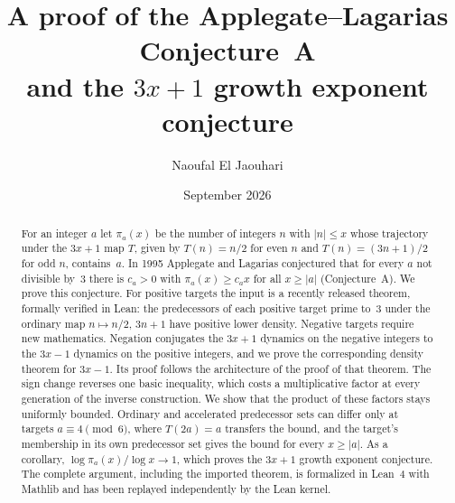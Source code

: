 \documentclass[11pt]{amsart}
\theoremstyle{definition}
\theoremstyle{remark}
\DeclareRobustCommand*{\xvar}{x}
\begin{document}
\title[Conjecture~A and the $3\xvar+1$ growth exponent conjecture]%
{A proof of the Applegate--Lagarias Conjecture~A\\ and the $3x+1$ growth exponent conjecture}

\author{Naoufal El Jaouhari}
\address{Independent researcher}


\date{September 2026}

\begin{abstract}
For an integer $a$ let $\pi_a(x)$ be the number of integers $n$ with $|n|\le x$ whose trajectory
under the $3x+1$ map $T$, given by $T(n)=n/2$ for even $n$ and $T(n)=(3n+1)/2$ for odd $n$,
contains~$a$. In 1995 Applegate and Lagarias conjectured that for every $a$ not divisible by~$3$
there is $c_a>0$ with $\pi_a(x)\ge c_a x$ for all $x\ge |a|$ (Conjecture~A). We prove this
conjecture. For positive targets the input is a recently released theorem, formally verified in
Lean: the predecessors of each positive target prime to~$3$ under the ordinary map
$n\mapsto n/2,\,3n+1$ have positive lower density. Negative targets require new mathematics. Negation conjugates the
$3x+1$ dynamics on the negative integers to the $3x-1$ dynamics on the positive integers, and we
prove the corresponding density theorem for $3x-1$. Its proof follows the architecture of the proof of that theorem. The
sign change reverses one basic inequality, which costs a multiplicative factor at every generation
of the inverse construction. We show that the product of these factors stays uniformly bounded.
Ordinary and accelerated predecessor sets can differ only at targets $a\equiv 4\pmod 6$, where
$T(2a)=a$ transfers the bound, and the target's membership in its own predecessor set gives the
bound for every $x\ge|a|$. As a corollary, $\log\pi_a(x)/\log x\to1$, which proves the $3x+1$
growth exponent conjecture. The complete argument, including the imported theorem, is formalized in
Lean~4 with Mathlib and has been replayed independently by the Lean kernel.
\end{abstract}

\maketitle
\end{document}
